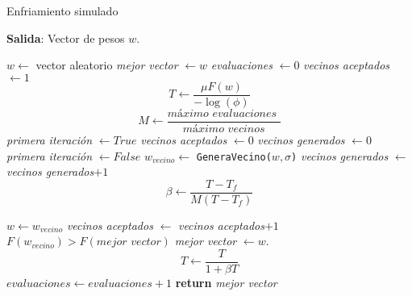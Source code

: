 \begin{algorithm}[H]
    \caption{Enfriamiento simulado}
        \hspace*{\algorithmicindent} 
        \textbf{Salida}:
        Vector de pesos $w$.        
    \begin{algorithmic}[1]
            
          \State $w \gets$ vector aleatorio   
          \State \textit{mejor vector} $\gets w$ 
          \State \textit{evaluaciones} $\gets 0$ 
          \State  \textit{vecinos aceptados} $\gets 1$
          \State  
          \begin{equation*}
              T 
              \gets
              \frac{ \mu F(w)}{ - \log(\phi)}
          \end{equation*}
          \State \begin{equation*}
            M \gets \frac{ \textit{máximo evaluaciones }}{\textit{máximo vecinos}}
          \end{equation*}
        \State \textit{primera iteración} $\gets True$ 
        \State \textit{vecinos aceptados}  $\gets 0$ 
        \State \textit{vecinos generados}  $\gets 0$ 
          \State \textit{primera iteración} $\gets False$ 
          \State $w_{vecino} \gets$ \texttt{GeneraVecino($w,\sigma$)}
          \State \textit{vecinos generados} $\gets$ \textit{vecinos generados}$+1$
          \State 
          \begin{equation*}
            \beta \gets 
            \frac{T -  T_f}{ M (T - T_f)}
          \end{equation*}

            \State $w \gets w_{vecino}$
            \State \textit{vecinos aceptados} $\gets$ \textit{vecinos aceptados}$+1$
            \If $F(w_{vecino}) > F(\textit{mejor vector})$
              \State \textit{mejor vector} $\gets w$. 
            \EndIf
          \EndIf
          \EndWhile
        \State
        \begin{equation*}
          T \gets
          \frac{T}{1 + \beta T}
        \end{equation*}
        \State $evaluaciones \gets evaluaciones +1$
        \EndWhile
        \State \textbf{return} \textit{mejor vector}
      \EndProcedure
    \end{algorithmic}
  \end{algorithm}